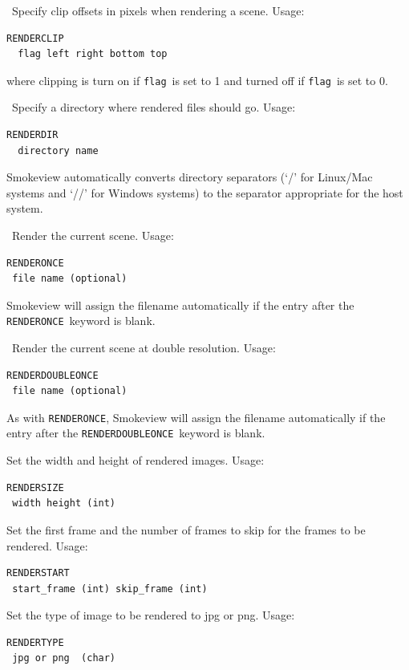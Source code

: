 \documentclass[11pt,twoside]{book}
\begin{document}
\ Specify clip offsets in pixels when
rendering a scene.  Usage:
\begin{lstlisting}
RENDERCLIP
  flag left right bottom top
\end{lstlisting}
where clipping is turn on if {\tt flag}\ is set to 1 and
turned off if {\tt flag}\ is set to 0.

\ Specify a
directory where rendered files should go. Usage:
\begin{lstlisting}
RENDERDIR
  directory name
\end{lstlisting}
Smokeview automatically converts directory separators (`/' for Linux/Mac systems
and `//' for Windows systems) to the separator appropriate for the host system.

\ Render the current scene.
Usage:
\begin{lstlisting}
RENDERONCE
 file name (optional)
\end{lstlisting}
Smokeview will assign the filename automatically if the
entry after the {\tt RENDERONCE}\ keyword is blank.

\ Render the current scene at double resolution.
Usage:
\begin{lstlisting}
RENDERDOUBLEONCE
 file name (optional)
\end{lstlisting}
As with {\tt RENDERONCE}, Smokeview will assign the filename
automatically if the entry after the {\tt RENDERDOUBLEONCE}\ keyword is blank.

Set the width and height of rendered images.
Usage:
\begin{lstlisting}
RENDERSIZE
 width height (int)
\end{lstlisting}

Set the first frame and the number of frames to skip for the frames to be rendered. Usage:
\begin{lstlisting}
RENDERSTART
 start_frame (int) skip_frame (int)
\end{lstlisting}

Set the type of image to be rendered to jpg or png. Usage:
\begin{lstlisting}
RENDERTYPE
 jpg or png  (char)
\end{lstlisting}
\end{document}
